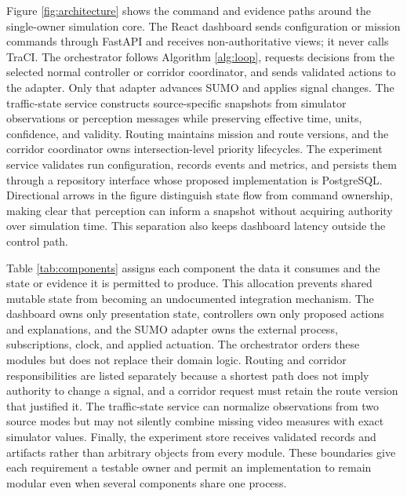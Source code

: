 Figure \ref{fig:architecture} shows the command and evidence paths around the single-owner simulation core. The React dashboard sends configuration or mission commands through FastAPI and receives non-authoritative views; it never calls TraCI. The orchestrator follows Algorithm \ref{alg:loop}, requests decisions from the selected normal controller or corridor coordinator, and sends validated actions to the adapter. Only that adapter advances SUMO and applies signal changes. The traffic-state service constructs source-specific snapshots from simulator observations or perception messages while preserving effective time, units, confidence, and validity. Routing maintains mission and route versions, and the corridor coordinator owns intersection-level priority lifecycles. The experiment service validates run configuration, records events and metrics, and persists them through a repository interface whose proposed implementation is PostgreSQL. Directional arrows in the figure distinguish state flow from command ownership, making clear that perception can inform a snapshot without acquiring authority over simulation time. This separation also keeps dashboard latency outside the control path.


Table \ref{tab:components} assigns each component the data it consumes and the state or evidence it is permitted to produce. This allocation prevents shared mutable state from becoming an undocumented integration mechanism. The dashboard owns only presentation state, controllers own only proposed actions and explanations, and the SUMO adapter owns the external process, subscriptions, clock, and applied actuation. The orchestrator orders these modules but does not replace their domain logic. Routing and corridor responsibilities are listed separately because a shortest path does not imply authority to change a signal, and a corridor request must retain the route version that justified it. The traffic-state service can normalize observations from two source modes but may not silently combine missing video measures with exact simulator values. Finally, the experiment store receives validated records and artifacts rather than arbitrary objects from every module. These boundaries give each requirement a testable owner and permit an implementation to remain modular even when several components share one process.

